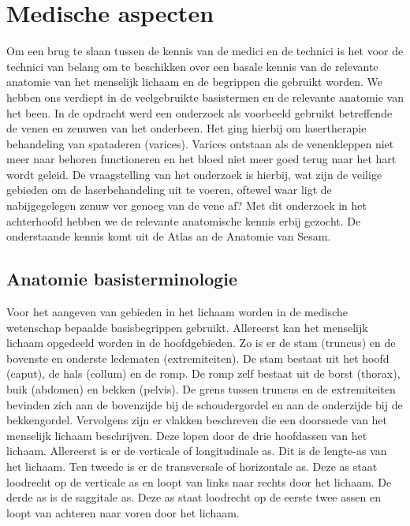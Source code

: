\section{Medische aspecten}
\label{Medische aspecten}


Om een brug te slaan tussen de kennis van de medici en de technici is het voor de technici van belang om te beschikken over een basale kennis van de relevante anatomie van het menselijk lichaam en de begrippen die gebruikt worden. We hebben ons verdiept in de veelgebruikte basistermen en de relevante anatomie van het been. In de opdracht werd een onderzoek als voorbeeld gebruikt betreffende de venen en zenuwen van het onderbeen. Het ging hierbij om lasertherapie behandeling van spataderen (varices). Varices ontstaan als de venenkleppen niet meer naar behoren functioneren en het bloed niet meer goed terug naar het hart wordt geleid. De vraagstelling van het onderzoek is hierbij, wat zijn de veilige gebieden om de laserbehandeling uit te voeren, oftewel waar ligt de nabijgegelegen zenuw ver genoeg van de vene af? Met dit onderzoek in het achterhoofd hebben we de relevante anatomische kennis erbij gezocht.
De onderstaande kennis komt uit de Atlas an de Anatomie van Sesam.\cite{sesam}

\subsection{Anatomie basisterminologie}

Voor het aangeven van gebieden in het lichaam worden in de medische wetenschap bepaalde basisbegrippen gebruikt. Allereerst kan het menselijk lichaam opgedeeld worden in de hoofdgebieden. 
Zo is er de stam (truncus) en de bovenste en onderste ledematen (extremiteiten). 
De stam bestaat uit het hoofd (caput), de hals (collum) en de romp. 
De romp zelf bestaat uit de borst (thorax), buik (abdomen) en bekken (pelvis). 
De grens tussen truncus en de extremiteiten bevinden zich aan de bovenzijde bij de schoudergordel en aan de onderzijde bij de bekkengordel. 
Vervolgens zijn er vlakken beschreven die een doorsnede van het menselijk lichaam beschrijven. Deze lopen door de drie hoofdassen van het lichaam. Allereerst is er de verticale of longitudinale as. Dit is de lengte-as van het lichaam. Ten tweede is er de transversale of horizontale as. Deze as staat loodrecht op de verticale as en loopt van links naar rechts door het lichaam. De derde as is de saggitale as. Deze as staat loodrecht op de eerste twee assen en loopt van achteren naar voren door het lichaam. 

